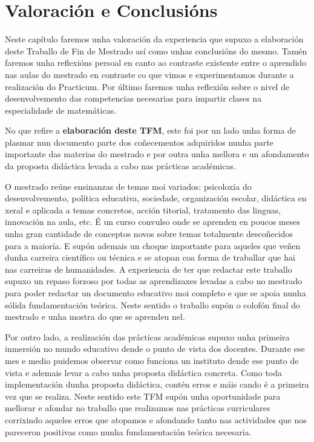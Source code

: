 

\chapter{Valoración e Conclusións}\label{chap:valoracion}

Neste capítulo faremos unha valoración da experiencia que supuxo a elaboración deste Traballo de Fin de Mestrado así como unhas conclusións do mesmo. Tamén faremos unha reflexións persoal en canto ao contraste existente entre o aprendido nas aulas do mestrado en contraste co que vimos e experimentamos durante a realización do Practicum. Por último faremos unha reflexión sobre o nivel de desenvolvemento das competencias necesarias para impartir clases na especialidade de matemáticas.


No que refire a \textbf{elaboración deste TFM}, este foi por un lado unha forma de plasmar nun documento parte dos coñecementos adquiridos nunha parte importante das materias do mestrado e por outra unha mellora e un afondamento da proposta didáctica levada a cabo nas prácticas académicas.

O mestrado reúne ensinanzas de temas moi variados: psicoloxía do desenvolvemento, política educativa, sociedade, organización escolar, didáctica en xeral e aplicada a temas concretos, acción titorial, tratamento das linguas, innovación na aula, etc. É un curso convulso onde se aprenden en poucos meses unha gran cantidade de conceptos novos sobre temas totalmente descoñecidos para a maioría. E supón ademais un choque importante para aqueles que veñen dunha carreira científico ou técnica e se atopan coa forma de traballar que hai nas carreiras de humanidades. A experiencia de ter que redactar este traballo supuxo un repaso forzoso por todas as aprendizaxes levadas a cabo no mestrado para poder redactar un documento educativo moi completo e que se apoia nunha sólida fundamentación teórica. Neste sentido o traballo supón o colofón final do mestrado e unha mostra do que se aprendeu nel.

Por outro lado, a realización das prácticas académicas supuxo unha primeira inmersión no mundo educativo dende o punto de vista dos docentes. Durante ese mes e medio puidemos observar como funciona un instituto dende ese punto de vista e ademais levar a cabo unha proposta didáctica concreta. Como toda implementación dunha proposta didáctica, contén erros e máis cando é a primeira vez que se realiza. Neste sentido este TFM supón unha oportunidade para mellorar e afondar no traballo que realizamos nas prácticas curriculares corrixindo aqueles erros que atopamos e afondando tanto nas actividades que nos pareceron positivas como nunha fundamentación teórica necesaria.

